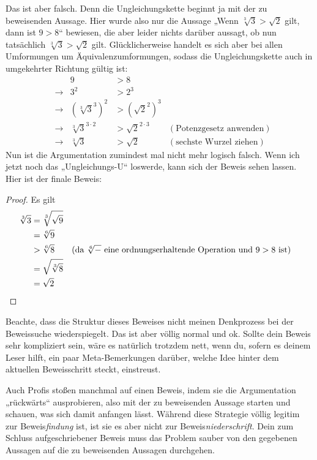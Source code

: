 \begin{bem}
    Das ist aber falsch. Denn die Ungleichungskette beginnt ja mit der zu beweisenden Aussage. Hier wurde also nur die Aussage „Wenn $\sqrt[3]{3} >\sqrt{2}$ gilt, dann ist $9>8$“ bewiesen, die aber leider nichts darüber aussagt, ob nun tatsächlich $\sqrt[3]{3} >\sqrt{2}$ gilt. Glücklicherweise handelt es sich aber bei allen Umformungen um Äquivalenzumformungen, sodass die Ungleichungskette auch in umgekehrter Richtung gültig ist:
    \begin{align*}
        && 9 & > 8 \\
        & \to & 3^2 & > 2^3 \\
        & \to & (\sqrt[3]{3}^3)^2 & > (\sqrt{2}^2)^3 \\
        & \to& \sqrt[3]{3}^{3\cdot 2} & > \sqrt{2}^{2\cdot 3} & (\text{Potenzgesetz anwenden}) \\
        &\to &  \sqrt[3]{3}& >\sqrt{2}  & (\text{sechste Wurzel ziehen})
    \end{align*}
    Nun ist die Argumentation zumindest mal nicht mehr logisch falsch. Wenn ich jetzt noch das „Ungleichungs-U“ loswerde, kann sich der Beweis sehen lassen. Hier ist der finale Beweis:
    \begin{proof}
        Es gilt
        \begingroup
        \allowdisplaybreaks
        \begin{align*}
            \sqrt[3]{3} & = \sqrt[3]{\sqrt{9}} \\
            & = \sqrt[6]{9} \\
            & > \sqrt[6]{8} & (\text{da $\sqrt[6]{-}$ eine ordnungserhaltende Operation und $9>8$ ist}) \\
            & = \sqrt{\sqrt[3]{8}} \\
            & = \sqrt{2} && \qedhere
        \end{align*}
        \endgroup
    \end{proof}
    Beachte, dass die Struktur dieses Beweises nicht meinen Denkprozess bei der Beweissuche wiederspiegelt. Das ist aber völlig normal und ok. Sollte dein Beweis sehr kompliziert sein, wäre es natürlich trotzdem nett, wenn du, sofern es deinem Leser hilft, ein paar Meta-Bemerkungen darüber, welche Idee hinter dem aktuellen Beweisschritt steckt, einstreust.
    
    Auch Profis stoßen manchmal auf einen Beweis, indem sie die Argumentation „rückwärts“ ausprobieren, also mit der zu beweisenden Aussage starten und schauen, was sich damit anfangen lässt. Während diese Strategie völlig legitim zur Beweis\emph{findung} ist, ist sie es aber nicht zur Beweis\emph{niederschrift}. Dein zum Schluss aufgeschriebener Beweis muss das Problem sauber von den gegebenen Aussagen auf die zu beweisenden Aussagen durchgehen.
    

\end{bem}
